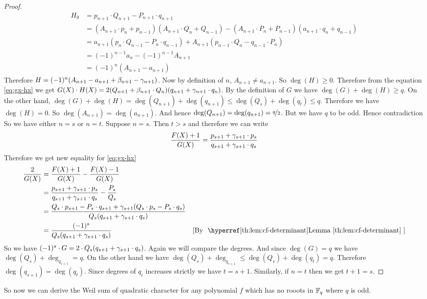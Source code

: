 \begin{proof}
  \begin{align*}
    H_0 & = p_{n+1}\cdot Q_{n+1}-P_{n+1}\cdot q_{n+1}\\ 
    & = (A_{n+1}\cdot p_n+p_{n-1})(A_{n+1}\cdot Q_n+Q_{n-1})-(A_{n+1}\cdot P_n+P_{n-1})(a_{n+1}\cdot q_n+q_{n-1})\\ 
    & = a_{n+1}(p_n\cdot Q_{n-1}-P_n\cdot q_{n-1}) +A_{n+1}(p_{n-1}\cdot Q_n-q_{n-1}\cdot P_n)\\ 
    &= (-1)^{n-1}a_n-(-1)^{n-1}A_{n+1}\\ 
    & = (-1)^n(A_{n+1}-a_{n+1})
  \end{align*}
  Therefore $H=(-1)^n(A_{n+1}-a_{n+1}+\beta_{n+1}-\gamma_{n+1})$. Now by definition of $n$, $A_{n+1}\neq a_{n+1}$. So $\deg(H)\geq 0$. Therefore from the equation \eqref{eq:gx-hx} we get $G(X)\cdot H(X)=2(Q_{n+1}+\beta_{n+1}\cdot Q_n)(q_{n+1}+\gamma_{n+1}\cdot q_n)$. By the definition of $G$ we have $\deg(G)+\deg(H)\geq q$. On the other hand, $\deg(G)+\deg(H)=\deg(Q_{n+1})+\deg(q_{n+1})\leq \deg(Q_s)+\deg(q_t)\leq q$. Therefore we have $\deg(H)=0$. So $\deg(A_{n+1})=\deg(a_{n+1})$. And hence $\deg(Q_{n+1})=\deg(q_{n+1})=\nicefrac{q}2$. But we have $q$ to be odd. Hence contradiction \ctr So we have either $n=s$ or $n=t$. Suppose $n=s$. Then $t>s$ and therefore we can write $$\frac{F(X)+1}{G(X)}=\frac{p_{s+1}+\gamma_{s+1}\cdot p_s}{q_{s+1}+\gamma_{s+1}\cdot q_s}$$Therefore we get new equality for \eqref{eq:gx-hx} 
  \begin{align*}
    \frac{2}{G(X)} & = \frac{F(X)+1}{G(X)}-\frac{F(X)-1}{G(X)}\\ 
    & = \frac{p_{s+1}+\gm_{s+1}\cdot p_s}{q_{s+1}+\gm_{s+1}\cdot q_s}-\frac{P_s}{Q_s}\\ 
    & = \frac{Q_s\cdot p_{s+1}-P_s\cdot q_{s+1}+\gm_{s+1}(Q_s\cdot p_s-P_s\cdot q_s)}{Q_s(q_{s+1}+\gm_{s+1}\cdot q_s)}\\ 
    & = \frac{(-1)^s}{Q_s(q_{s+1}+\gm_{s+1}\cdot q_s)}\byl{cf-determinant}
  \end{align*}
  So we have $(-1)^s\cdot G=2\cdot Q_s(q_{s+1}+\gamma_{s+1}\cdot q_s)$. Again we will compare the degrees. And since $\deg(G)=q$ we have $\deg(Q_s)+\deg_{q_{s+1}}=q$. On the other hand we have $\deg(Q_s)+\deg_{q_{s+1}}\leq \deg(Q_s)+\deg(q_t)=q$. Therefore $\deg(q_{s+1})=\deg(q_t)$. Since degrees of $q_i$ increases strictly we have $t=s+1$. Similarly, if $n=t$ then we get $t+1=s$.
\end{proof}
So now we can derive the Weil sum of quadratic character for any polynomial $f$ which has no rooots in $\mathbb{F}_q$ where $q$ is odd.


